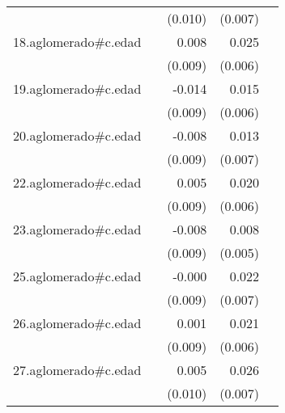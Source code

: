 {\begin{longtable}{l*{4}{D{.}{.}{-1}}}
            &                     &     (0.010)         &     (0.007)         &                     \\
\addlinespace
18.aglomerado#c.edad&                     &       0.008         &       0.025\sym{***}&                     \\
            &                     &     (0.009)         &     (0.006)         &                     \\
\addlinespace
19.aglomerado#c.edad&                     &      -0.014         &       0.015\sym{**} &                     \\
            &                     &     (0.009)         &     (0.006)         &                     \\
\addlinespace
20.aglomerado#c.edad&                     &      -0.008         &       0.013         &                     \\
            &                     &     (0.009)         &     (0.007)         &                     \\
\addlinespace
22.aglomerado#c.edad&                     &       0.005         &       0.020\sym{***}&                     \\
            &                     &     (0.009)         &     (0.006)         &                     \\
\addlinespace
23.aglomerado#c.edad&                     &      -0.008         &       0.008         &                     \\
            &                     &     (0.009)         &     (0.005)         &                     \\
\addlinespace
25.aglomerado#c.edad&                     &      -0.000         &       0.022\sym{**} &                     \\
            &                     &     (0.009)         &     (0.007)         &                     \\
\addlinespace
26.aglomerado#c.edad&                     &       0.001         &       0.021\sym{***}&                     \\
            &                     &     (0.009)         &     (0.006)         &                     \\
\addlinespace
27.aglomerado#c.edad&                     &       0.005         &       0.026\sym{***}&                     \\
            &                     &     (0.010)         &     (0.007)         &                     \\

\end{longtable}}
